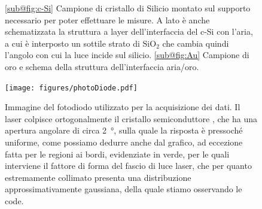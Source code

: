 \documentclass[prb,showpacs,floatfix,altaffilletter,amsmath,amssymb,reprint,citeautoscript]{revtex4-1}
\begin{document}
\begin{figure}
    \centering
    
    \caption{\ref{sub@fig:c-Si} Campione di  cristallo di Silicio montato sul supporto necessario per poter effettuare le misure. A lato è anche schematizzata la struttura a layer dell'interfaccia del c-Si con l'aria, a cui è interposto un sottile strato di $\mathrm{SiO_2}$ che cambia quindi l'angolo con cui la luce incide sul silicio. \ref{sub@fig:Au} Campione di oro e schema della struttura dell'interfaccia aria/oro. }
\end{figure}

\begin{figure}
    \centering
    \texttt{[image: figures/photoDiode.pdf]}
    \caption{Immagine del fotodiodo utilizzato per la acquisizione dei dati. Il laser colpisce ortogonalmente il cristallo semiconduttore , che ha una apertura angolare di circa \SI{2}{\degree}, sulla quale la risposta è pressoché uniforme, come possiamo dedurre anche dal grafico, ad eccezione fatta per le regioni ai bordi, evidenziate in verde, per le quali interviene il fattore di forma del fascio di luce laser, che per quanto estremamente collimato presenta una distribuzione approssimativamente gaussiana, della quale stiamo osservando le code. }
    \label{fig:photo-diode}
\end{figure}
\end{document}
